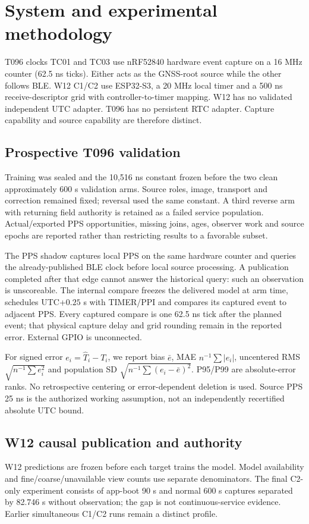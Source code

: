\documentclass[11pt,letterpaper]{article}
\begin{document}
\section{System and experimental methodology}
T096 clocks TC01 and TC03 use nRF52840 hardware event capture on a 16 MHz counter (62.5 ns ticks). Either acts as the GNSS-root source while the other follows BLE. W12 C1/C2 use ESP32-S3, a 20 MHz local timer and a 500 ns receive-descriptor grid with controller-to-timer mapping. W12 has no validated independent UTC adapter. T096 has no persistent RTC adapter. Capture capability and source capability are therefore distinct.

\subsection{Prospective T096 validation}
Training was sealed and the 10,516 ns constant frozen before the two clean approximately 600 s validation arms. Source roles, image, transport and correction remained fixed; reversal used the same constant. A third reverse arm with returning field authority is retained as a failed service population. Actual/exported PPS opportunities, missing joins, ages, observer work and source epochs are reported rather than restricting results to a favorable subset.

The PPS shadow captures local PPS on the same hardware counter and queries the already-published BLE clock before local source processing. A publication completed after that edge cannot answer the historical query: such an observation is unscoreable. The internal compare freezes the delivered model at arm time, schedules UTC+$0.25$ s with TIMER/PPI and compares its captured event to adjacent PPS. Every captured compare is one 62.5 ns tick after the planned event; that physical capture delay and grid rounding remain in the reported error. External GPIO is unconnected.

For signed error $e_i=\widehat T_i-T_i$, we report bias $\bar e$, MAE $n^{-1}\sum|e_i|$, uncentered RMS $\sqrt{n^{-1}\sum e_i^2}$ and population SD $\sqrt{n^{-1}\sum(e_i-\bar e)^2}$. P95/P99 are absolute-error ranks. No retrospective centering or error-dependent deletion is used. Source PPS 25 ns is the authorized working assumption, not an independently recertified absolute UTC bound.

\subsection{W12 causal publication and authority}
W12 predictions are frozen before each target trains the model. Model availability and fine/coarse/unavailable view counts use separate denominators. The final C2-only experiment consists of app-boot 90 s and normal 600 s captures separated by 82.746 s without observation; the gap is not continuous-service evidence. Earlier simultaneous C1/C2 runs remain a distinct profile.
\end{document}
